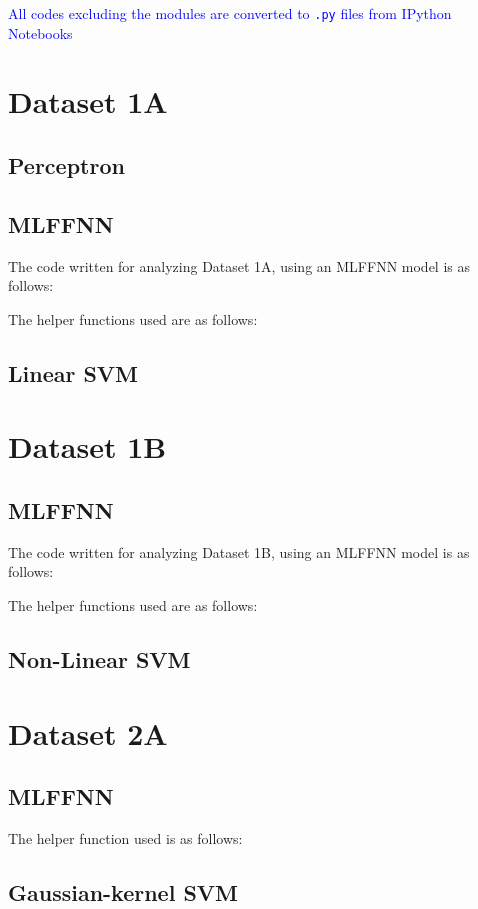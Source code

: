\documentclass[11pt,a4paper]{article}
\newcommand{\noi}{\noindent}
\def\tt#1{\texttt{#1}}
\begin{document}
{\hypersetup{linkcolor=black}
 \tableofcontents}
\break

\noi
\textcolor{blue}{All codes excluding the modules are converted to \tt{.py} files from IPython Notebooks}

\section{Dataset 1A}
\subsection{Perceptron}
\subsection{MLFFNN}
The code written for analyzing Dataset 1A, using an MLFFNN model is as follows:\vspace{-1em}


\vspace{1em}
\noi
The helper functions used are as follows:\vspace{-1em}



\subsection{Linear SVM}

\section{Dataset 1B}
\subsection{MLFFNN}
The code written for analyzing Dataset 1B, using an MLFFNN model is as follows:\vspace{-1em}


\vspace{1em}
\noi
The helper functions used are as follows:\vspace{-1em}


\subsection{Non-Linear SVM}

\section{Dataset 2A}
\subsection{MLFFNN}
The helper function used is as follows:\vspace{-1em}


\subsection{Gaussian-kernel SVM}
\end{document}
